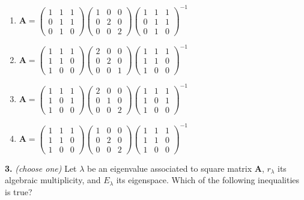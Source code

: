 \documentclass[10pt,a4paper]{article}
\begin{document}
\begin{enumerate}[label=(\Alph*)]
\item \(\mathbf{A}=\begin{pmatrix}1&1&1\\0&1&1\\0&1&0\end{pmatrix}\begin{pmatrix}1&0&0\\0&2&0\\0&0&2\end{pmatrix}\begin{pmatrix}1&1&1\\0&1&1\\0&1&0\end{pmatrix}^{-1}\)
\item \(\mathbf{A}=\begin{pmatrix}1&1&1\\1&1&0\\1&0&0\end{pmatrix}\begin{pmatrix}2&0&0\\0&2&0\\0&0&1\end{pmatrix}\begin{pmatrix}1&1&1\\1&1&0\\1&0&0\end{pmatrix}^{-1}\)
\item \(\mathbf{A}=\begin{pmatrix}1&1&1\\1&0&1\\1&0&0\end{pmatrix}\begin{pmatrix}2&0&0\\0&1&0\\0&0&2\end{pmatrix}\begin{pmatrix}1&1&1\\1&0&1\\1&0&0\end{pmatrix}^{-1}\)
\item \(\mathbf{A}=\begin{pmatrix}1&1&1\\1&1&0\\1&0&0\end{pmatrix}\begin{pmatrix}1&0&0\\0&2&0\\0&0&2\end{pmatrix}\begin{pmatrix}1&1&1\\1&1&0\\1&0&0\end{pmatrix}^{-1}\)
\end{enumerate}
\smallskip
\textbf{3.} \textit{(choose one)} Let \(\lambda\) be an eigenvalue associated to square matrix \(\mathbf A\), \(r_\lambda\) its algebraic multiplicity, and \(E_\lambda\) its eigenspace. Which of the following inequalities is true?
\end{document}
